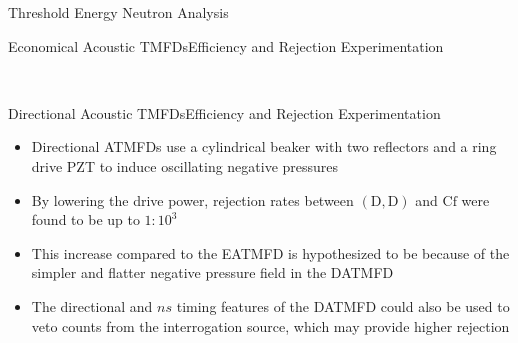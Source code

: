\begin{cell}{6}{12}{Threshold Energy Neutron Analysis}{}
\begin{cell}{3}{3}{Economical Acoustic TMFDs}{Efficiency and Rejection Experimentation}
  \end{cell}%
  \hspace*{\fill}
  \begin{cell}{3}{3}{}{}
  \end{cell} \\
  \vspace*{\fill}
  \begin{cell}{3}{3}{}{}
  \end{cell}
  \hspace*{\fill}
  \begin{cell}{3}{3}{Directional Acoustic TMFDs}{Efficiency and Rejection Experimentation}
    \begin{itemize}
      \item Directional ATMFDs use a cylindrical beaker with two reflectors and a ring drive PZT to induce oscillating negative pressures
      \item By lowering the drive power, rejection rates between $\mathrm{\left(D,D\right)}$ and $\mathrm{Cf}$ were found to be up to $1:10^{3}$
      \item This increase compared to the EATMFD is hypothesized to be because of the simpler and flatter negative pressure field in the DATMFD
      \item The directional and $ns$ timing features of the DATMFD could also be used to veto counts from the interrogation source, which may provide higher rejection
    \end{itemize}
  \end{cell}%
\end{cell}%
\hspace*{.5in}
